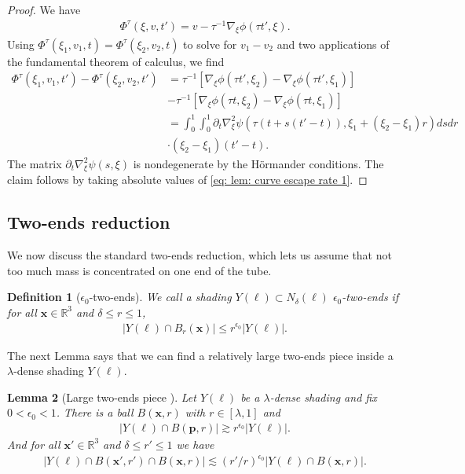 \documentclass[12pt]{amsart}
\newcommand{\x}{{\bf{x}}}
\numberwithin{equation}{section}
\newtheorem{lemma}{Lemma}[section]
\newtheorem{definition}[lemma]{Definition}
\newcommand{\R}{\mathbb{R}}
\newcommand{\1}{\mathbbm{1}}
\newcommand{\p}{\mathbf p}
\renewcommand{\x}{\mathbf x}
\begin{document}
\begin{proof}
    We have 
    \begin{align}
        \Phi^\tau(\xi, v, t') = v - \tau^{-1} \nabla_\xi \phi(\tau t', \xi). 
    \end{align}
    Using $\Phi^\tau(\xi_1, v_1, t) = \Phi^\tau(\xi_2, v_2, t)$ to solve for $v_1 - v_2$ and two applications of the fundamental theorem of calculus, we find
    \begin{align}
        \Phi^\tau(\xi_1, v_1, t') - \Phi^\tau(\xi_2, v_2, t') &= \tau^{-1} [\nabla_\xi \phi(\tau t', \xi_2) - \nabla_\xi \phi(\tau t', \xi_1)] \\ &- \tau^{-1} [\nabla_\xi \phi(\tau t, \xi_2)- \nabla_\xi \phi(\tau t, \xi_1)] \\
        &= \int_0^1 \int_0^1 \partial_t \nabla_\xi^2 \psi(\tau (t + s(t'-t)), \xi_1 + (\xi_2 - \xi_1)r)dsdr \label{eq: lem: curve escape rate 1} \\&\cdot (\xi_2 - \xi_1) (t' - t).  \nonumber
    \end{align}
    The matrix $\partial_t \nabla_\xi^2 \psi(s, \xi)$ is nondegenerate by the H\"ormander conditions. The claim follows by taking absolute values of \eqref{eq: lem: curve escape rate 1}. 
\end{proof}


\subsection{Two-ends reduction}

We now discuss the standard two-ends reduction, which lets us assume that not too much mass is concentrated on one end of the tube. 
\begin{definition}[$\epsilon_0$-two-ends]\label{def: two ends}
    We call a shading $Y(\ell) \subset N_\delta(\ell)$ $\epsilon_0$-two-ends if for all $\x \in \R^3$ and $\delta \leq r \leq 1$, 
    \begin{align}
        |Y(\ell) \cap B_r(\x)| \leq r^{\epsilon_0} |Y(\ell)|. 
    \end{align}
\end{definition}
The next Lemma says that we can find a relatively large two-ends piece inside a $\lambda$-dense shading $Y(\ell)$. 

\begin{lemma}[Large two-ends piece ]\label{lem: two ends piece}
    Let $Y(\ell)$ be a $\lambda$-dense shading and fix $0 < \epsilon_0 < 1$. There is a ball $B(\x, r)$ with $r \in [\lambda, 1]$ and 
    \begin{align}
        |Y(\ell) \cap B(\p, r)| \gtrsim r^{\epsilon_0} |Y(\ell)|. 
    \end{align}
    And for all $\x' \in \R^3$ and $\delta \leq r' \leq 1$ we have 
    \begin{align}
        |Y(\ell) \cap B(\x', r') \cap B(\x, r)| \lesssim (r'/ r)^{\epsilon_0} |Y(\ell) \cap B(\x, r)|. 
    \end{align}
\end{lemma}
\end{document}
